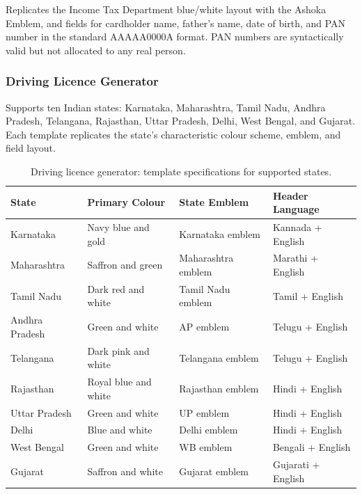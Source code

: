 \documentclass[12pt,a4paper,oneside]{report}
\begin{document}
Replicates the Income Tax Department blue/white layout with the Ashoka Emblem,
and fields for cardholder name, father's name, date of birth, and PAN number in
the standard AAAAA0000A format. PAN numbers are syntactically valid but not
allocated to any real person.

\subsubsection{Driving Licence Generator}

Supports ten Indian states: Karnataka, Maharashtra, Tamil Nadu, Andhra Pradesh,
Telangana, Rajasthan, Uttar Pradesh, Delhi, West Bengal, and Gujarat. Each
template replicates the state's characteristic colour scheme, emblem, and field
layout.

\begin{table}[H]
\centering
\caption{Driving licence generator: template specifications for supported states.}
\label{tab:dl_templates}
\renewcommand{\arraystretch}{1.3}
\begin{tabular}{llll}
\toprule
\textbf{State} & \textbf{Primary Colour} & \textbf{State Emblem} & \textbf{Header Language} \\
\midrule
Karnataka        & Navy blue and gold    & Karnataka emblem      & Kannada + English \\
Maharashtra      & Saffron and green     & Maharashtra emblem    & Marathi + English \\
Tamil Nadu       & Dark red and white    & Tamil Nadu emblem     & Tamil + English \\
Andhra Pradesh   & Green and white       & AP emblem             & Telugu + English \\
Telangana        & Dark pink and white   & Telangana emblem      & Telugu + English \\
Rajasthan        & Royal blue and white  & Rajasthan emblem      & Hindi + English \\
Uttar Pradesh    & Green and white       & UP emblem             & Hindi + English \\
Delhi            & Blue and white        & Delhi emblem          & Hindi + English \\
West Bengal      & Green and white       & WB emblem             & Bengali + English \\
Gujarat          & Saffron and white     & Gujarat emblem        & Gujarati + English \\
\bottomrule
\end{tabular}
\end{table}
\end{document}
